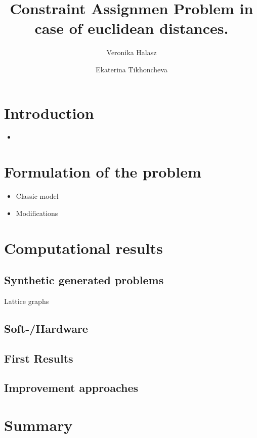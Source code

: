 \documentclass[
	fontsize=12pt,
	paper=a4,
	twoside=false,
	numbers=noenddot,
	plainheadsepline,
	toc=listof,
	toc=bibliography
]{scrartcl}
\begin{document}
\title{Constraint Assignmen Problem in case of euclidean distances. }
\author{ Veronika Halasz \and Ekaterina Tikhoncheva}
\maketitle
\section{Introduction}
  \begin{itemize}
   \item
  \end{itemize}

\section{Formulation of the problem}
  \begin{itemize}
   \item Classic model
   \item Modifications
  \end{itemize}
  
\section{Computational results}
  \subsection{Synthetic generated problems}
    Lattice graphs
  \subsection{Soft-/Hardware}
  \subsection{First Results}
  \subsection{Improvement approaches}
  
\section{Summary}




\end{document}
